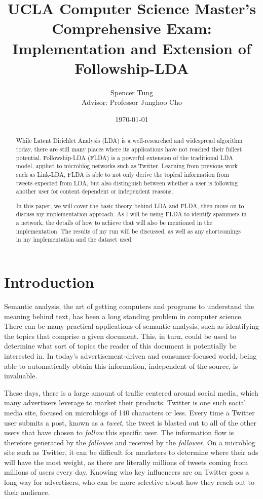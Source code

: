 \documentclass[a4paper]{article}
\title{UCLA Computer Science Master's Comprehensive Exam: Implementation and Extension of Followship-LDA}
\author{Spencer Tung \\ Advisor: Professor Junghoo Cho}
\date{\today}
\begin{document}
\maketitle

\begin{abstract}
While Latent Dirichlet Analysis (LDA) is a well-researched and widespread algorithm today, there are still many places where its applications have not reached their fullest potential. Followship-LDA (FLDA) is a powerful extension of the traditional LDA model, applied to microblog networks such as Twitter. Learning from previous work such as Link-LDA, FLDA is able to not only derive the topical information from tweets expected from LDA, but also distinguish between whether a user is following another user for content dependent or independent reasons.

In this paper, we will cover the basic theory behind LDA and FLDA, then move on to discuss my implementation approach. As I will be using FLDA to identify spammers in a network, the details of how to achieve that will also be mentioned in the implementation. The results of my run will be discussed, as well as any shortcomings in my implementation and the dataset used.
\end{abstract}

\section{Introduction}
Semantic analysis, the art of getting computers and programs to understand the meaning behind text, has been a long standing problem in computer science. There can be many practical applications of semantic analysis, such as identifying the topics that comprise a given document. This, in turn, could be used to determine what sort of topics the reader of this document is potentially be interested in. In today's advertisement-driven and consumer-focused world, being able to automatically obtain this information, independent of the source, is invaluable.

These days, there is a large amount of traffic centered around social media, which many advertisers leverage to market their products. Twitter is one such social media site, focused on microblogs of 140 characters or less. Every time a Twitter user submits a post, known as a \textit{tweet}, the tweet is blasted out to all of the other users that have chosen to \textit{follow} this specific user. The information flow is therefore generated by the \textit{followee} and received by the \textit{follower}. On a microblog site such as Twitter, it can be difficult for marketers to determine where their ads will have the most weight, as there are literally millions of tweets coming from millions of users every day. Knowing who key influencers are on Twitter goes a long way for advertisers, who can be more selective about how they reach out to their audience.
\end{document}
